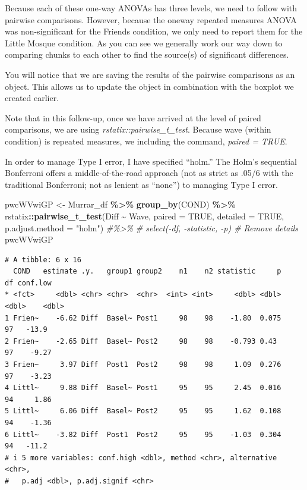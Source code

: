 \documentclass[
  11pt,
]{book}
\newenvironment{Shaded}{\begin{snugshade}}{\end{snugshade}}
\newcommand{\AttributeTok}[1]{\textcolor[rgb]{0.27,0.27,0.27}{#1}}
\newcommand{\CommentTok}[1]{\textcolor[rgb]{0.37,0.37,0.37}{\textit{#1}}}
\newcommand{\ConstantTok}[1]{\textcolor[rgb]{0.37,0.37,0.37}{#1}}
\newcommand{\FunctionTok}[1]{\textcolor[rgb]{0.27,0.27,0.27}{\textbf{#1}}}
\newcommand{\NormalTok}[1]{#1}
\newcommand{\OtherTok}[1]{\textcolor[rgb]{0.37,0.37,0.37}{#1}}
\newcommand{\SpecialCharTok}[1]{\textcolor[rgb]{0.43,0.43,0.43}{\textbf{#1}}}
\newcommand{\StringTok}[1]{\textcolor[rgb]{0.5,0.5,0.5}{#1}}
\begin{document}
Because each of these one-way ANOVAs has three levels, we need to follow with pairwise comparisons. However, because the oneway repeated measures ANOVA was non-significant for the Friends condition, we only need to report them for the Little Mosque condition. As you can see we generally work our way down to comparing chunks to each other to find the source(s) of significant differences.

You will notice that we are saving the results of the pairwise comparisons as an object. This allows us to update the object in combination with the boxplot we created earlier.

Note that in this follow-up, once we have arrived at the level of paired comparisons, we are using \emph{rstatix::pairwise\_t\_test}. Because wave (within condition) is repeated measures, we including the command, \emph{paired = TRUE}.

In order to manage Type I error, I have specified ``holm.'' The Holm's sequential Bonferroni offers a middle-of-the-road approach (not as strict as .05/6 with the traditional Bonferroni; not as lenient as ``none'') to managing Type I error.

\begin{Shaded}
\begin{Highlighting}[]
\NormalTok{pwcWVwiGP }\OtherTok{\textless{}{-}}\NormalTok{ Murrar\_df }\SpecialCharTok{\%\textgreater{}\%}
    \FunctionTok{group\_by}\NormalTok{(COND) }\SpecialCharTok{\%\textgreater{}\%}
\NormalTok{    rstatix}\SpecialCharTok{::}\FunctionTok{pairwise\_t\_test}\NormalTok{(Diff }\SpecialCharTok{\textasciitilde{}}\NormalTok{ Wave, }\AttributeTok{paired =} \ConstantTok{TRUE}\NormalTok{, }\AttributeTok{detailed =} \ConstantTok{TRUE}\NormalTok{,}
        \AttributeTok{p.adjust.method =} \StringTok{"holm"}\NormalTok{)  }\CommentTok{\#\%\textgreater{}\%}
\CommentTok{\# select({-}df, {-}statistic, {-}p) \# Remove details}
\NormalTok{pwcWVwiGP}
\end{Highlighting}
\end{Shaded}

\begin{verbatim}
# A tibble: 6 x 16
  COND   estimate .y.   group1 group2    n1    n2 statistic     p    df conf.low
* <fct>     <dbl> <chr> <chr>  <chr>  <int> <int>     <dbl> <dbl> <dbl>    <dbl>
1 Frien~    -6.62 Diff  Basel~ Post1     98    98    -1.80  0.075    97   -13.9 
2 Frien~    -2.65 Diff  Basel~ Post2     98    98    -0.793 0.43     97    -9.27
3 Frien~     3.97 Diff  Post1  Post2     98    98     1.09  0.276    97    -3.23
4 Littl~     9.88 Diff  Basel~ Post1     95    95     2.45  0.016    94     1.86
5 Littl~     6.06 Diff  Basel~ Post2     95    95     1.62  0.108    94    -1.36
6 Littl~    -3.82 Diff  Post1  Post2     95    95    -1.03  0.304    94   -11.2 
# i 5 more variables: conf.high <dbl>, method <chr>, alternative <chr>,
#   p.adj <dbl>, p.adj.signif <chr>
\end{verbatim}
\end{document}
